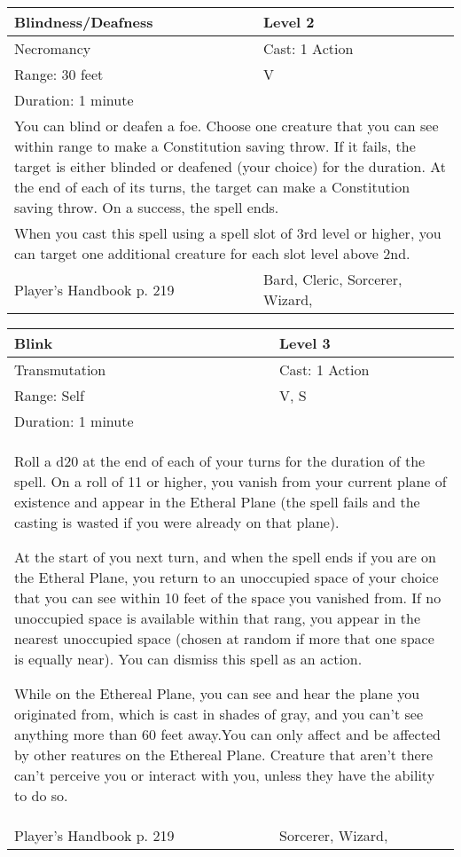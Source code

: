\documentclass[11pt]{report}
\begin{document}
\begin{table}[H]
	\begin{tabular}{||p{6cm}|p{6cm}||}
		\hline\hline
		\bf{Blindness/Deafness} & Level 2\\ \hline
		Necromancy & Cast: 1 Action\\ \hline
		Range: 30 feet & V\\ \hline
		Duration: 1 minute & \\ \hline
		\multicolumn{2}{||p{12cm}||}{You can blind or deafen a foe. Choose one creature that you can see within range to make a Constitution saving throw. If it fails, the target is either blinded or deafened (your choice) for the duration. At the end of each of its turns, the target can make a Constitution saving throw. On a success, the spell ends.}\\ \hline
		\multicolumn{2}{||p{12cm}||}{When you cast this spell using a spell slot of 3rd level or higher, you can target one additional creature for each slot level above 2nd.}\\ \hline
Player's Handbook p. 219 & Bard, Cleric, Sorcerer, Wizard, \\ \hline\hline
	\end{tabular}
\end{table}

\begin{table}[H]
	\begin{tabular}{||p{6cm}|p{6cm}||}
		\hline\hline
		\bf{Blink} & Level 3\\ \hline
		Transmutation & Cast: 1 Action\\ \hline
		Range: Self & V, S\\ \hline
		Duration: 1 minute & \\ \hline
		\multicolumn{2}{||p{12cm}||}{Roll a d20 at the end of each of your turns for the duration of the spell. On a roll of 11 or higher, you vanish from your current plane of existence and appear in the Etheral Plane (the spell fails and the casting is wasted if you were already on that plane). 

At the start of you next turn, and when the spell ends if you are on the Etheral Plane, you return to an unoccupied space of your choice that you can see within 10 feet of the space you vanished from. If no unoccupied space is available within that rang, you appear in the nearest unoccupied space (chosen at random if more that one space is equally near). You can dismiss this spell as an action. 

While on the Ethereal Plane, you can see and hear the plane you originated from, which is cast in shades of gray, and you can’t see anything more than 60 feet away.You can only affect and be affected by other reatures on the Ethereal Plane. Creature that aren’t there can’t perceive you or interact with you, unless they have the ability to do so.}\\ \hline
Player's Handbook p. 219 & Sorcerer, Wizard, \\ \hline\hline
	\end{tabular}
\end{table}
\end{document}
